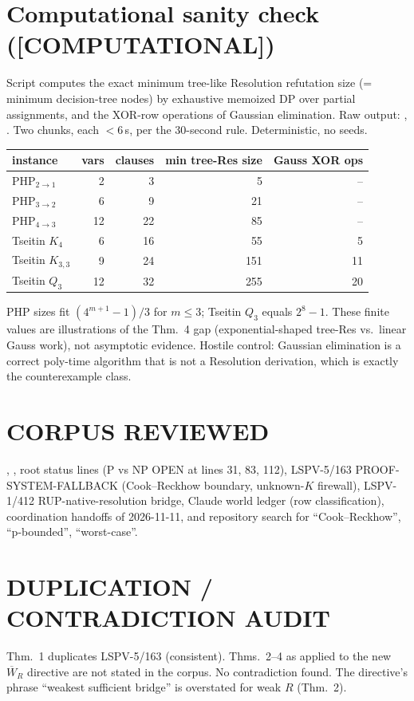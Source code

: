 \documentclass[11pt]{article}
\theoremstyle{definition}
\newcommand{\WR}{\overline W_R}
\newcommand{\st}[1]{\textbf{[#1]}}
\begin{document}
\section{Computational sanity check (\st{COMPUTATIONAL})}
Script  computes the exact
minimum tree-like Resolution refutation size (= minimum decision-tree nodes) by exhaustive
memoized DP over partial assignments, and the XOR-row operations of Gaussian elimination.
Raw output: , . Two chunks, each
$<6$\,s, per the 30-second rule. Deterministic, no seeds.
\begin{center}\begin{tabular}{lrrrr}\toprule
instance & vars & clauses & min tree-Res size & Gauss XOR ops\\\midrule
PHP$_{2\to1}$ & 2 & 3 & 5 & --\\
PHP$_{3\to2}$ & 6 & 9 & 21 & --\\
PHP$_{4\to3}$ & 12 & 22 & 85 & --\\
Tseitin $K_4$ & 6 & 16 & 55 & 5\\
Tseitin $K_{3,3}$ & 9 & 24 & 151 & 11\\
Tseitin $Q_3$ & 12 & 32 & 255 & 20\\\bottomrule\end{tabular}\end{center}
PHP sizes fit $(4^{m+1}-1)/3$ for $m\le3$; Tseitin $Q_3$ equals $2^{8}-1$. These finite values
are illustrations of the Thm.~4 gap (exponential-shaped tree-Res vs.\ linear Gauss work),
not asymptotic evidence. Hostile control: Gaussian elimination is a correct poly-time
algorithm that is not a Resolution derivation, which is exactly the counterexample class.

\section*{CORPUS REVIEWED}
, , root  status lines (P vs NP OPEN at
lines 31, 83, 112), LSPV-5/163 PROOF-SYSTEM-FALLBACK (Cook--Reckhow boundary, unknown-$K$
firewall), LSPV-1/412 RUP-native-resolution bridge, Claude world ledger (row classification),
coordination handoffs of 2026-11-11, and repository search for ``Cook--Reckhow'',
``p-bounded'', ``worst-case''.
\section*{DUPLICATION / CONTRADICTION AUDIT}
Thm.~1 duplicates LSPV-5/163 (consistent). Thms.~2--4 as applied to the new $\WR$ directive
are not stated in the corpus. No contradiction found. The directive's phrase ``weakest
sufficient bridge'' is overstated for weak $R$ (Thm.~2).
\end{document}
